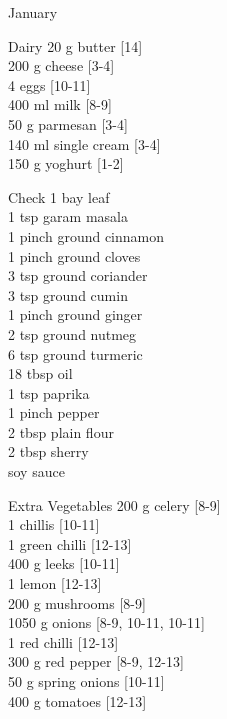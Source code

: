 \begin{menu}{January}
      \begin{shoppinglist}{Dairy}
      20 g butter {\scriptsize[14]}\\
      200 g cheese {\scriptsize[3-4]}\\
      4  eggs {\scriptsize[10-11]}\\
      400 ml milk {\scriptsize[8-9]}\\
      50 g parmesan {\scriptsize[3-4]}\\
      140 ml single cream {\scriptsize[3-4]}\\
      150 g yoghurt {\scriptsize[1-2]}\\
      \end{shoppinglist}%
      \par\vfil %
      \vfil\clearpage %
      \begin{shoppinglist}{Check}
      1  bay leaf \\
      1 tsp garam masala \\
      1 pinch ground cinnamon \\
      1 pinch ground cloves \\
      3 tsp ground coriander \\
      3 tsp ground cumin \\
      1 pinch ground ginger \\
      2 tsp ground nutmeg \\
      6 tsp ground turmeric \\
      18 tbsp oil \\
      1 tsp paprika \\
      1 pinch pepper \\
      2 tbsp plain flour \\
      2 tbsp sherry \\
       soy sauce \\
      \end{shoppinglist}%
      \begin{shoppinglist}{Extra Vegetables}
      200 g celery {\scriptsize[8-9]}\\
      1  chillis {\scriptsize[10-11]}\\
      1  green chilli {\scriptsize[12-13]}\\
      400 g leeks {\scriptsize[10-11]}\\
      1  lemon {\scriptsize[12-13]}\\
      200 g mushrooms {\scriptsize[8-9]}\\
      1050 g onions {\scriptsize[8-9, 10-11, 10-11]}\\
      1  red chilli {\scriptsize[12-13]}\\
      300 g red pepper {\scriptsize[8-9, 12-13]}\\
      50 g spring onions {\scriptsize[10-11]}\\
      400 g tomatoes {\scriptsize[12-13]}\\
      \end{shoppinglist}%
      \par\vfil %
    \vfil\clearpage
  

\end{menu}
